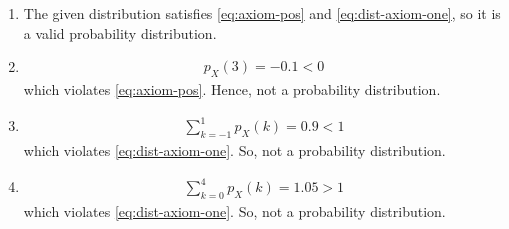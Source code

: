 %
\begin{enumerate}
	\item The given distribution satisfies
	\eqref{eq:axiom-pos}
	and
	\eqref{eq:dist-axiom-one},
so it is a valid probability distribution.
   \item 
   \begin{align}
	   p_{X}(3) =-0.1 < 0
   \end{align}
   which violates 
	\eqref{eq:axiom-pos}.
Hence, not a probability distribution.  
 \item 
   \begin{align}
	   \sum_{k=-1}^{1}p_{X}(k) = 0.9 < 1
   \end{align}
   which violates
	\eqref{eq:dist-axiom-one}.
So, not a probability distribution. 
   \item 
   \begin{align}
       \sum_{k=0}^{4}p_{X}(k)  = 1.05 > 1
  \end{align}
   which violates
	\eqref{eq:dist-axiom-one}.
So, not a probability distribution. 
\end{enumerate}
